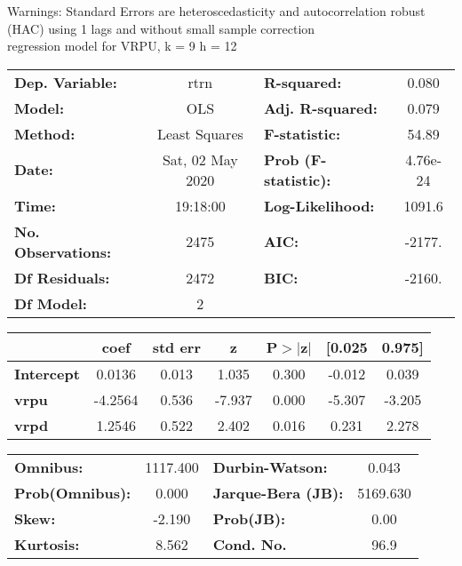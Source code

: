 Warnings: \newline
 [1] Standard Errors are heteroscedasticity and autocorrelation robust (HAC) using 1 lags and without small sample correction\\ 

regression model for VRPU, k = 9 h = 12\begin{center}
\begin{tabular}{lclc}
\toprule
\textbf{Dep. Variable:}    &       rtrn       & \textbf{  R-squared:         } &     0.080   \\
\textbf{Model:}            &       OLS        & \textbf{  Adj. R-squared:    } &     0.079   \\
\textbf{Method:}           &  Least Squares   & \textbf{  F-statistic:       } &     54.89   \\
\textbf{Date:}             & Sat, 02 May 2020 & \textbf{  Prob (F-statistic):} &  4.76e-24   \\
\textbf{Time:}             &     19:18:00     & \textbf{  Log-Likelihood:    } &    1091.6   \\
\textbf{No. Observations:} &        2475      & \textbf{  AIC:               } &    -2177.   \\
\textbf{Df Residuals:}     &        2472      & \textbf{  BIC:               } &    -2160.   \\
\textbf{Df Model:}         &           2      & \textbf{                     } &             \\
\bottomrule
\end{tabular}
\begin{tabular}{lcccccc}
                   & \textbf{coef} & \textbf{std err} & \textbf{z} & \textbf{P$> |$z$|$} & \textbf{[0.025} & \textbf{0.975]}  \\
\midrule
\textbf{Intercept} &       0.0136  &        0.013     &     1.035  &         0.300        &       -0.012    &        0.039     \\
\textbf{vrpu}      &      -4.2564  &        0.536     &    -7.937  &         0.000        &       -5.307    &       -3.205     \\
\textbf{vrpd}      &       1.2546  &        0.522     &     2.402  &         0.016        &        0.231    &        2.278     \\
\bottomrule
\end{tabular}
\begin{tabular}{lclc}
\textbf{Omnibus:}       & 1117.400 & \textbf{  Durbin-Watson:     } &    0.043  \\
\textbf{Prob(Omnibus):} &   0.000  & \textbf{  Jarque-Bera (JB):  } & 5169.630  \\
\textbf{Skew:}          &  -2.190  & \textbf{  Prob(JB):          } &     0.00  \\
\textbf{Kurtosis:}      &   8.562  & \textbf{  Cond. No.          } &     96.9  \\
\bottomrule
\end{tabular}
\end{center}

